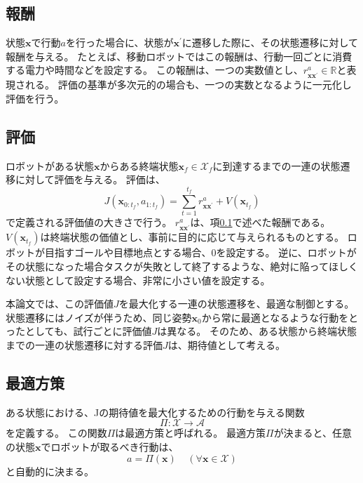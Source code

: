\subsection{報酬} \label{subsection:reward}
状態$\bm{x}$で行動$a$を行った場合に、状態が$\bm{x}^{'}$に遷移した際に、その状態遷移に対して報酬を与える。
たとえば、移動ロボットではこの報酬は、行動一回ごとに消費する電力や時間などを設定する。
この報酬は、一つの実数値とし、$r^{a}_{\bm{x}\bm{x}^{'}} \in \mathbb{R}$と表現される。
評価の基準が多次元的の場合も、一つの実数となるように一元化し評価を行う。

\subsection{評価}
ロボットがある状態$\bm{x}$からある終端状態$\bm{x}_{f} \in \mathcal{X}_{f}$に到達するまでの一連の状態遷移に対して評価を与える。
評価は、
\begin{equation}
\label{evaluation}
  J( \bm{x}_{0:t_{f}}, a_{1:t_{f}} ) = \sum^{t_{f}}_{t=1} r^{a}_{\bm{x}\bm{x}^{'}} + V(\bm{x}_{t_{f}})
\end{equation}
で定義される評価値の大きさで行う。
$r^{a}_{\bm{x}\bm{x}^{'}}$は、項\ref{subsection:reward}で述べた報酬である。
$V(\bm{x}_{t_{f}})$は終端状態の価値とし、事前に目的に応じて与えられるものとする。
ロボットが目指すゴールや目標地点とする場合、$0$を設定する。
逆に、ロボットがその状態になった場合タスクが失敗として終了するような、絶対に陥ってほしくない状態として設定する場合、非常に小さい値を設定する。

本論文では、この評価値$J$を最大化する一連の状態遷移を、最適な制御とする。
状態遷移にはノイズが伴うため、同じ姿勢$\bm{x}_{0}$から常に最適となるような行動をとったとしても、試行ごとに評価値$J$は異なる。
そのため、ある状態から終端状態までの一連の状態遷移に対する評価$J$は、期待値として考える。

\subsection{最適方策}
ある状態における、Jの期待値を最大化するための行動を与える関数
\begin{equation}
\label{policy}
  \Pi : \mathcal{X} \rightarrow \mathcal{A}
\end{equation}
を定義する。
この関数$\Pi$は最適方策と呼ばれる。
最適方策$\Pi$が決まると、任意の状態$\bm{x}$でロボットが取るべき行動は、
\begin{equation}
\label{oprimal action}
  a = \Pi(\bm{x}) \;\;\;\; (\forall \bm{x} \in \mathcal{X})
\end{equation}
と自動的に決まる。

